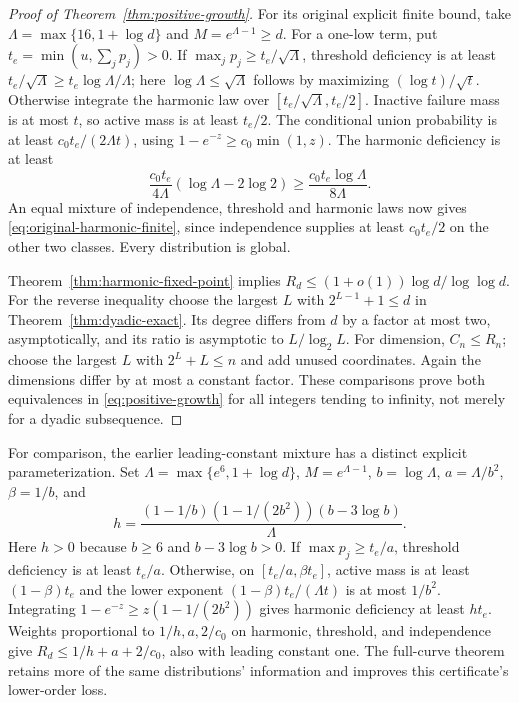 \begin{proof}[Proof of Theorem~\ref{thm:positive-growth}]
For its original explicit finite bound, take
$\Lambda=\max\{16,1+\log d\}$ and $M=e^{\Lambda-1}\ge d$.
For a one-low term, put $t_e=\min(u,\sum_jp_j)>0$.
If $\max_jp_j\ge t_e/\sqrt\Lambda$, threshold deficiency is at least
$t_e/\sqrt\Lambda\ge t_e\log\Lambda/\Lambda$; here
$\log\Lambda\le\sqrt\Lambda$ follows by maximizing
$(\log t)/\sqrt t$. Otherwise integrate the harmonic law over
$[t_e/\sqrt\Lambda,t_e/2]$. Inactive failure mass is at most $t$,
so active mass is at least $t_e/2$. The conditional union probability is
at least $c_0t_e/(2\Lambda t)$, using $1-e^{-z}\ge c_0\min(1,z)$.
The harmonic deficiency is at least
\[
 \frac{c_0t_e}{4\Lambda}(\log\Lambda-2\log2)
 \ge\frac{c_0t_e\log\Lambda}{8\Lambda}.
\]
An equal mixture of independence, threshold and harmonic laws now gives
\eqref{eq:original-harmonic-finite}, since independence supplies at least
$c_0t_e/2$ on the other two classes. Every distribution is global.

Theorem~\ref{thm:harmonic-fixed-point} implies
$R_d\le(1+o(1))\log d/\log\log d$.
For the reverse inequality choose the largest $L$ with
$2^{L-1}+1\le d$ in Theorem~\ref{thm:dyadic-exact}. Its degree differs
from $d$ by a factor at most two, asymptotically, and its ratio is
asymptotic to $L/\log_2 L$. For dimension, $C_n\le R_n$; choose the
largest $L$ with $2^L+L\le n$ and add unused coordinates. Again the
dimensions differ by at most a constant factor. These comparisons prove
both equivalences in \eqref{eq:positive-growth} for all integers tending
to infinity, not merely for a dyadic subsequence.
\end{proof}

For comparison, the earlier leading-constant mixture has a distinct explicit
parameterization. Set $\Lambda=\max\{e^6,1+\log d\}$,
$M=e^{\Lambda-1}$, $b=\log\Lambda$, $a=\Lambda/b^2$, $\beta=1/b$, and
\begin{equation}\label{eq:older-leading-mixture}
 h=\frac{(1-1/b)(1-1/(2b^2))(b-3\log b)}{\Lambda}.
\end{equation}
Here $h>0$ because $b\ge6$ and $b-3\log b>0$.
If $\max p_j\ge t_e/a$, threshold deficiency is at least $t_e/a$.
Otherwise, on $[t_e/a,\beta t_e]$, active mass is at least
$(1-\beta)t_e$ and the lower exponent
$(1-\beta)t_e/(\Lambda t)$ is at most $1/b^2$.
Integrating $1-e^{-z}\ge z(1-1/(2b^2))$ gives harmonic deficiency
at least $ht_e$. Weights proportional to $1/h,a,2/c_0$ on harmonic,
threshold, and independence give $R_d\le1/h+a+2/c_0$, also with leading
constant one. The full-curve theorem retains more of the same distributions'
information and improves this certificate's lower-order loss.

